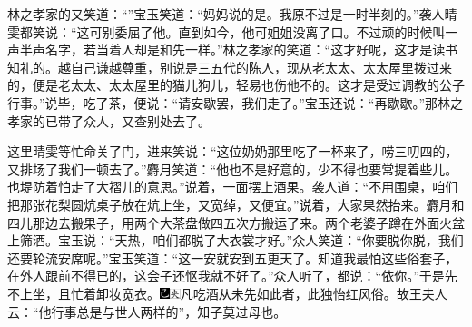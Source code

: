 林之孝家的又笑道：``''宝玉笑道：``妈妈说的是。我原不过是一时半刻的。''袭人晴雯都笑说：``这可别委屈了他。直到如今，他可姐姐没离了口。不过顽的时候叫一声半声名字，若当着人却是和先一样。''林之孝家的笑道：``这才好呢，这才是读书知礼的。越自己谦越尊重，别说是三五代的陈人，现从老太太、太太屋里拨过来的，便是老太太、太太屋里的猫儿狗儿，轻易也伤他不的。这才是受过调教的公子行事。''说毕，吃了茶，便说：``请安歇罢，我们走了。''宝玉还说：``再歇歇。''那林之孝家的已带了众人，又查别处去了。

这里晴雯等忙命关了门，进来笑说：``这位奶奶那里吃了一杯来了，唠三叨四的，又排场了我们一顿去了。''麝月笑道：``他也不是好意的，少不得也要常提着些儿。也堤防着怕走了大褶儿的意思。''说着，一面摆上酒果。袭人道：``不用围桌，咱们把那张花梨圆炕桌子放在炕上坐，又宽绰，又便宜。''说着，大家果然抬来。麝月和四儿那边去搬果子，用两个大茶盘做四五次方搬运了来。两个老婆子蹲在外面火盆上筛酒。宝玉说：``天热，咱们都脱了大衣裳才好。''众人笑道：``你要脱你脱，我们还要轮流安席呢。''宝玉笑道：``这一安就安到五更天了。知道我最怕这些俗套子，在外人跟前不得已的，这会子还怄我就不好了。''众人听了，都说：``依你。''于是先不上坐，且忙着卸妆宽衣。{\includegraphics[width=3mm]{../Images/00003}\includegraphics[width=3mm]{../Images/00012}\footnotesize \kaishu 凡吃酒从未先如此者，此独怡红风俗。故王夫人云：``他行事总是与世人两样的''，知子莫过母也。}

